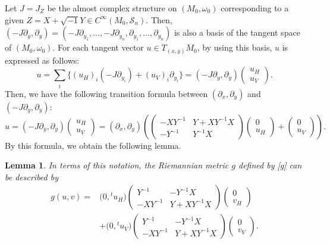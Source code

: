 \documentclass[10pt,a4paper]{amsart}
\numberwithin{equation}{section}
\newtheorem{Lemma}[Theorem]{Lemma}
\begin{document}
Let $J=J_Z$ be the almost complex structure on $(M_0,\omega_0)$ corresponding to a given $Z=X+\sqrt{-1}Y\in C^\infty ( M_0,{\mathcal S}_n)$. Then, $(-J\partial_y, \partial_y)= (-J\partial_{y_1},\ldots,-J\partial_{y_n}, \partial_{y_1},\ldots ,\partial_{y_n} )$ is also a basis of the tangent space of $(M_0,\omega_0)$. For each tangent vector $u\in T_{(x,y)}M_0$, by using this basis, $u$ is expressed as follows:
\[
u=\sum_i\{ (u_H)_i(-J\partial_{y_i})+(u_V)_i\partial_{y_i}\}=(-J\partial_y, \partial_y)
\begin{pmatrix}
u_H\\
u_V
\end{pmatrix}.
\]
Then, we have the following transition formula between $ (\partial_x, \partial_y )$ and $(-J\partial_y, \partial_y)$:
\begin{equation*}%
u=(-J\partial_y, \partial_y)
\begin{pmatrix}
u_H\\
u_V
\end{pmatrix}
=(\partial_x, \partial_y)\left(
\begin{pmatrix}
-XY^{-1} & Y+XY^{-1}X \\
-Y^{-1} & Y^{-1}X
\end{pmatrix}
\begin{pmatrix}
0\\
u_H
\end{pmatrix}
+
\begin{pmatrix}
0\\
u_V
\end{pmatrix}
\right) .
\end{equation*}
By this formula, we obtain the following lemma.
\begin{Lemma}\label{g2}
In terms of this notation, the Riemannian metric $g$ defined by \eqref{g} can be described by
\begin{align*}
g(u,v)={}&\bigl(0,{}^tu_H\bigr)
\begin{pmatrix}
Y^{-1} & -Y^{-1}X \\
-XY^{-1} & Y+XY^{-1}X
\end{pmatrix}
\begin{pmatrix}
0\\
v_H
\end{pmatrix}\\
&
+\bigl(0,{}^tu_V\bigr)
\begin{pmatrix}
Y^{-1} & -Y^{-1}X \\
-XY^{-1} & Y+XY^{-1}X
\end{pmatrix}
\begin{pmatrix}
0\\
v_V
\end{pmatrix}.
\end{align*}
\end{Lemma}
\end{document}
